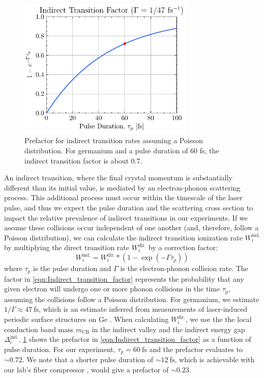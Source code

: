 \begin{figure}
	\centering
	\includegraphics[width=0.75\textwidth]{figures/chap4/Indirect_transition_factor.pdf}
	\caption{Prefactor for indirect transition rates assuming a Poisson distribution. For germanium and a pulse duration of 60 fs, the indirect transition factor is about 0.7.}
	\label{fig:Indirect_transition_factor}
\end{figure}

An indirect transition, where the final crystal momentum is substantially different than its initial value, is mediated by an electron-phonon scattering process. This additional process must occur within the timescale of the laser pulse, and thus we expect the pulse duration and the scattering cross section to impact the relative prevalence of indirect transitions in our experiments. If we assume these collisions occur independent of one another (and, therefore, follow a Poisson distribution), we can calculate the indirect transition ionization rate $W_i^{\textrm{ind.}}$ by multiplying the direct transition rate $W_i^{\textrm{dir.}}$ by a correction factor:
\begin{equation}
W_i^{\textrm{ind.}} = W_i^{\textrm{dir.}} * (1 - \exp(-\Gamma \tau_p))
\label{eqn:Indirect_transition_factor}
\end{equation}
where $\tau_p$ is the pulse duration and $\Gamma$ is the electron-phonon collision rate. The factor in \cref{eqn:Indirect_transition_factor} represents the probability that any given electron will undergo one or more phonon collisions in the time $\tau_p$, assuming the collisions follow a Poisson distribution. For germanium, we estimate $1/\Gamma \approx 47 \ \textrm{fs}$, which is an estimate inferred from measurements of laser-induced periodic surface structures on Ge \cite{austinSemiconductorSurfaceModification2017}. When calculating $W_i^{\textrm{dir.}}$, we use the the local conduction band mass $m_{\textrm{CB}}$ in the indirect valley and the indirect energy gap $\Delta_i^{\textrm{ind.}}$. \cref{fig:Indirect_transition_factor} shows the prefactor in \cref{eqn:Indirect_transition_factor} as a function of pulse duration. For our experiment, $\tau_p = 60 \ \textrm{fs}$ and the prefactor evaluates to $\sim 0.72$. We note that a shorter pulse duration of $\sim 12 \ \textrm{fs}$, which is achievable with our lab's fiber compressor \cite{zhangAtomicMolecularDynamics2015}, would give a prefactor of $\sim 0.23$.

